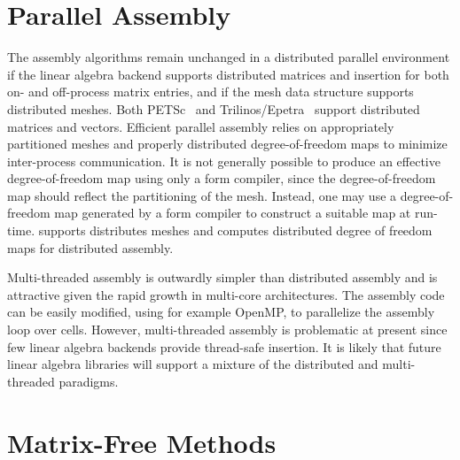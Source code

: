 \section{Parallel Assembly}

The assembly algorithms remain unchanged in a distributed parallel
environment if the linear algebra backend supports distributed
matrices and insertion for both on- and off-process matrix entries,
and if the mesh data structure supports distributed meshes. Both
PETSc~\cite{BalayBuschelmanGroppEtAl2001,BalayBuschelmanEtAl2004} and
Trilinos/Epetra~\cite{HerouxBartlettHowleEtAl2005} support distributed
matrices and vectors. Efficient parallel assembly relies on
appropriately partitioned meshes and properly distributed
degree-of-freedom maps to minimize inter-process communication.  It is
not generally possible to produce an effective degree-of-freedom map
using only a form compiler, since the degree-of-freedom map should
reflect the partitioning of the mesh. Instead, one may use a
degree-of-freedom map generated by a form compiler to construct a
suitable map at run-time.
\dolfin{} supports distributes meshes and computes distributed
degree of freedom maps for distributed assembly.

Multi-threaded assembly is outwardly simpler than distributed assembly
and is attractive given the rapid growth in multi-core architectures.
The assembly code can be easily modified, using for example OpenMP,
to parallelize
the assembly loop over cells.  However, multi-threaded assembly is
problematic at present since few linear algebra backends provide
thread-safe insertion. It is likely that future linear algebra
libraries will support a mixture of the distributed and multi-threaded
paradigms.

\section{Matrix-Free Methods}

